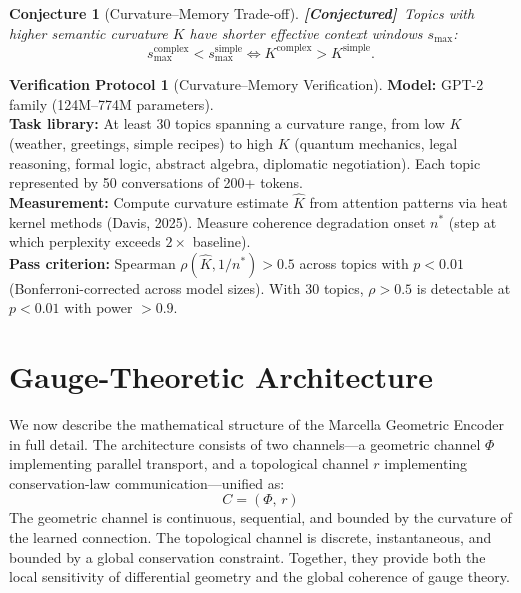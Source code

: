 \documentclass[11pt,a4paper]{article}
\newtheorem{conjecture}[theorem]{Conjecture}
\theoremstyle{definition}
\newtheorem{protocol}[theorem]{Verification Protocol}
\theoremstyle{remark}
\newcommand{\statusconjecture}{\textcolor{orange!80!black}{\textbf{[Conjectured]}}}
\begin{document}
\begin{conjecture}[Curvature--Memory Trade-off]\label{conj:curvature_memory}
\statusconjecture\ Topics with higher semantic curvature $K$ have 
shorter effective context windows $s_{\max}$:
\begin{equation}\label{eq:curvature_memory}
    s_{\max}^{\text{complex}} < s_{\max}^{\text{simple}} 
    \iff K^{\text{complex}} > K^{\text{simple}}.
\end{equation}
\end{conjecture}


\begin{protocol}[Curvature--Memory Verification]\label{prot:curvature_memory}
\textbf{Model:} GPT-2 family (124M--774M parameters). \\
\textbf{Task library:} At least 30 topics spanning a curvature 
range, from low $K$ (weather, greetings, simple recipes) to 
high $K$ (quantum mechanics, legal reasoning, formal logic, 
abstract algebra, diplomatic negotiation). Each topic represented 
by 50 conversations of 200+ tokens. \\
\textbf{Measurement:} Compute curvature estimate $\hat{K}$ from 
attention patterns via heat kernel methods (Davis, 2025). Measure 
coherence degradation onset $n^*$ (step at which perplexity 
exceeds $2\times$ baseline). \\
\textbf{Pass criterion:} Spearman $\rho(\hat{K}, 1/n^*) > 0.5$ 
across topics with $p < 0.01$ (Bonferroni-corrected across 
model sizes). With 30 topics, 
$\rho > 0.5$ is detectable at $p < 0.01$ with power $> 0.9$.
\end{protocol}


\section{Gauge-Theoretic Architecture}
\label{sec:gauge-architecture}

We now describe the mathematical structure of the Marcella Geometric 
Encoder in full detail. The architecture consists of two 
channels---a geometric channel $\Phi$ implementing parallel 
transport, and a topological channel $r$ implementing 
conservation-law communication---unified as:
\begin{equation}
    C = (\Phi, \, r)
\label{eq:dual-channel}
\end{equation}
The geometric channel is continuous, sequential, and bounded by 
the curvature of the learned connection. The topological channel 
is discrete, instantaneous, and bounded by a global conservation 
constraint. Together, they provide both the local sensitivity of 
differential geometry and the global coherence of gauge theory.
\end{document}
